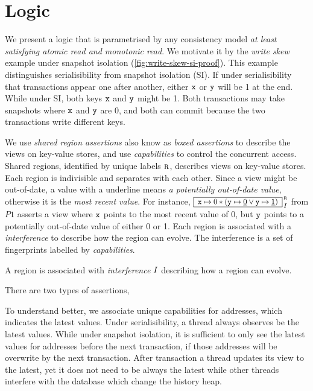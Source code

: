 \section{Logic}


We present a logic that is parametrised by any consistency model \emph{at least satisfying atomic  read and monotonic read}.
We motivate it by the \emph{write skew} example under snapshot isolation (\cref{fig:write-skew-si-proof}).
This example distinguishes serialisibility from snapshot isolation (SI).
If under serialisibility that transactions appear one after another, either \( \texttt{x} \) or \( \texttt{y} \) will be 1 at the end.
While under SI, both keys \( \texttt{x} \) and \( \texttt{y} \) might be 1.
Both transactions may take snapshots where \( \texttt{x} \) and \( \texttt{y} \) are 0, and both can commit because the two transactions write different keys.

We use \emph{shared region assertions} also know as \emph{boxed assertions} to describe the views on key-value stores, and use \emph{capabilities} to control the concurrent access.
Shared regions, identified by unique labels \( \lrid \), describes views on key-value stores.
Each region is indivisible and separates with each other.
Since a view might be out-of-date, a value with a underline means \emph{a potentially out-of-date value}, otherwise it is the \emph{most recent value}.
For instance, \( \boxass{\vx \pt 0 \sep ( \vy \pt \underline{0}  \lor \vy \pt \underline{1} ) }{\lrid}{\intass}\) from \( P1 \) asserts a view where \( \texttt{x} \) points to the most recent value of 0, but \( \texttt{y} \) points to a potentially out-of-date value of either 0 or 1.
Each region is associated with a \emph{interference} to describe how the region can evolve.
The interference is a set of fingerprints labelled by \emph{capabilities}.

A region is associated with \emph{interference} \( I \) describing how a region can evolve.

There are two types of assertions, 

To understand better, we associate unique capabilities for addresses, which indicates the latest values.
Under serialisibility, a thread always observes be the latest values.
While under snapshot isolation, it is sufficient to only see the latest values for addresses before the next transaction, if those addresses will be overwrite by the next transaction.
After transaction a thread updates its view to the latest, yet it does not need to be always the latest while other threads interfere with the database which change the history heap.

